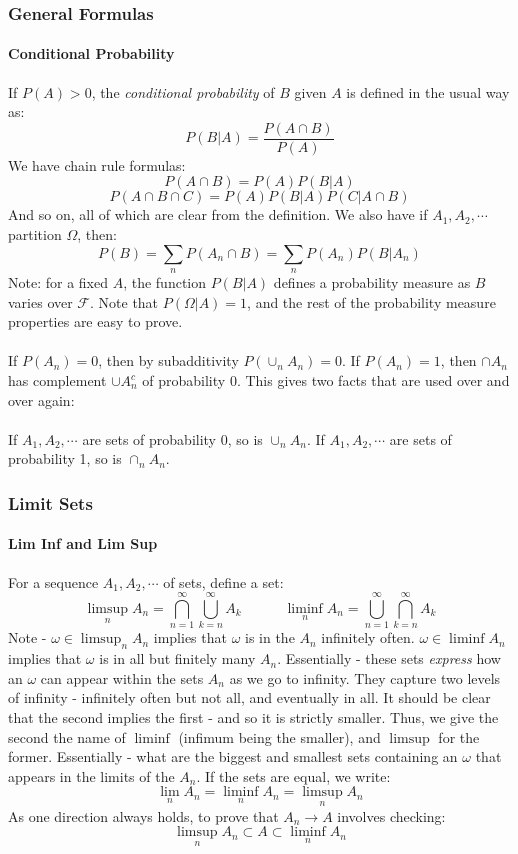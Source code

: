 \documentclass[12pt,a4paper]{article}
\newcommand{\1}[1]{\mathbbm{1}\left\{ #1 \right\}}
\newcommand{\fcal}{\mathcal{F}}
\begin{document}
\subsubsection{General Formulas}
\paragraph{Conditional Probability} If $P(A) > 0$, the \textit{conditional probability} of $B$ given $A$ is defined in the usual way as:
$$
	P(B | A) = \frac{P(A \cap B)}{P(A)}
$$
We have chain rule formulas:
$$
	P(A \cap B) = P(A)P(B | A)
$$
$$
	P(A \cap B \cap C) = P(A)P(B | A)P(C | A \cap B)
$$
And so on, all of which are clear from the definition. We also have if $A_1, A_2, \cdots$ partition $\Omega$, then:
$$
	P(B) = \sum_n P(A_n \cap B) = \sum_n P(A_n)P(B | A_n)
$$
Note: for a fixed $A$, the function $P(B|A)$ defines a probability measure as $B$ varies over $\fcal$. Note that $P(\Omega | A) = 1$, and the rest of the probability measure properties are easy to prove.
\\\\
If $P(A_n) = 0$, then by subadditivity $P(\cup_n A_n) = 0$. If $P(A_n) = 1$, then $\cap A_n$ has complement $\cup A_n^c$ of probability $0$. This gives two facts that are used over and over again:
\\\\
If $A_1, A_2, \cdots$ are sets of probability 0, so is $\cup_n A_n$. If $A_1, A_2, \cdots$ are sets of probability 1, so is $\cap_n A_n$. 

\subsubsection{Limit Sets}
\paragraph{Lim Inf and Lim Sup} For a sequence $A_1, A_2, \cdots$ of sets, define a set:
$$
	\limsup_n A_n = \bigcap_{n=1}^\infty \bigcup_{k=n}^\infty A_k \quad\quad\quad
	\liminf_n A_n = \bigcup_{n=1}^\infty \bigcap_{k=n}^\infty A_k
$$
Note - $\omega \in \limsup_n A_n$ implies that $\omega$ is in the $A_n$ infinitely often. $\omega \in \liminf A_n$ implies that $\omega$ is in all but finitely many $A_n$. Essentially - these sets \textit{express} how an $\omega$ can appear within the sets $A_n$ as we go to infinity. They capture two levels of infinity - infinitely often but not all, and eventually in all. It should be clear that the second implies the first - and so it is strictly smaller. Thus, we give the second the name of $\liminf$ (infimum being the smaller), and $\limsup$ for the former. Essentially - what are the biggest and smallest sets containing an $\omega$ that appears in the limits of the $A_n$. If the sets are equal, we write:
$$
	\lim_n A_n = \liminf_n A_n = \limsup_n A_n
$$
As one direction always holds, to prove that $A_n \to A$ involves checking:
$$
	\limsup_n A_n \subset A \subset \liminf_n A_n
$$
\end{document}
